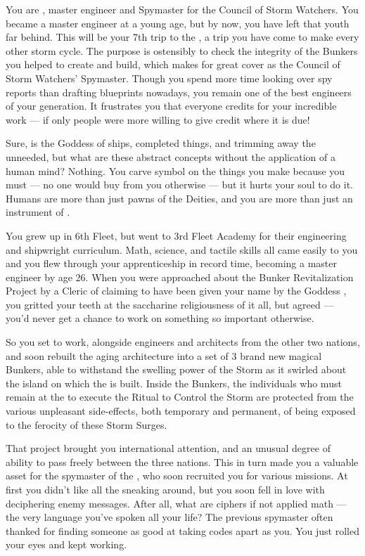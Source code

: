 \documentclass[char]{GL2020}
\begin{document}
\name{\cBunker{}}

You are \cBunker{\intro}, master engineer and Spymaster for the \pShip{} Council of Storm Watchers. You became a master engineer at a young age, but by now, you have left that youth far behind. This will be your 7th trip to the \pSchool{}, a trip you have come to make every other storm cycle. The purpose is ostensibly to check the integrity of the Bunkers you helped to create and build, which makes for great cover as the Council of Storm Watchers’ Spymaster. Though you spend more time looking over spy reports than drafting blueprints nowadays, you remain one of the best engineers of your generation. It frustrates you that everyone credits \cEbb{\intro} for your incredible work — if only people were more willing to give credit where it is due!

Sure, \cEbb{} is the Goddess of ships, completed things, and trimming away the unneeded, but what are these abstract concepts without the application of a human mind? Nothing. You carve \cEbb{\their} symbol on the things you make because you must — no one would buy from you otherwise — but it hurts your soul to do it. Humans are more than just pawns of the Deities, and you are more than just an instrument of \cEbb{\them}.

You grew up in 6th Fleet, but went to 3rd Fleet Academy for their engineering and shipwright curriculum. Math, science, and tactile skills all came easily to you and you flew through your apprenticeship in record time, becoming a master engineer by age 26. When you were approached about the Bunker Revitalization Project by a Cleric of \cEbb{} claiming to have been given your name by the Goddess \cEbb{\themself}, you gritted your teeth at the saccharine religiousness of it all, but agreed — you'd never get a chance to work on something so important otherwise. 

So you set to work, alongside engineers and architects from the other two nations, and soon rebuilt the aging architecture into a set of 3 brand new magical Bunkers, able to withstand the swelling power of the Storm as it swirled about the island on which the \pSchool{} is built. Inside the Bunkers, the individuals who must remain at the \pSc{} to execute the Ritual to Control the Storm are protected from the various unpleasant side-effects, both temporary and permanent, of being exposed to the ferocity of these Storm Surges.

That project brought you international attention, and an unusual degree of ability to pass freely between the three nations. This in turn made you a valuable asset for the spymaster of the \pShip{}, who soon recruited you for various missions. At first you didn't like all the sneaking around, but you soon fell in love with deciphering enemy messages. After all, what are ciphers if not applied math — the very language you've spoken all your life? The previous spymaster often thanked \cEbb{} for finding someone as good at taking codes apart as you. You just rolled your eyes and kept working.
\end{document}
